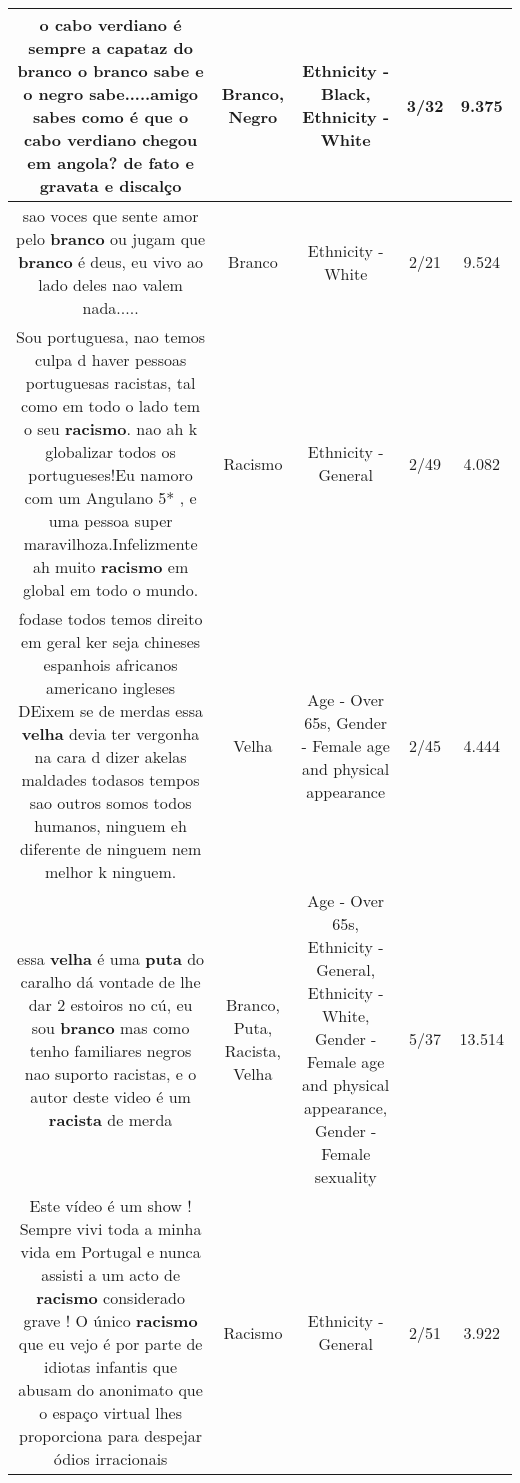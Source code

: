 \documentclass[11pt]{article}
\newlength\mylength
\begin{document}
\begin{center}
\begin{longtable}{|C{.65\mylength}|C{.30\mylength}|C{.12\mylength}|C{.12\mylength}|C{.12\mylength}|}
  \small o cabo verdiano é sempre a capataz do \textbf{branco} o \textbf{branco} sabe e o \textbf{negro} sabe.....amigo sabes como é que o cabo verdiano chegou em angola? de fato e gravata e discalço\normalsize   & Branco, Negro & Ethnicity - Black, Ethnicity - White & 3/32 & 9.375 \\  \hline
  \small sao voces que sente amor pelo \textbf{branco} ou jugam que \textbf{branco} é deus, eu vivo ao lado deles nao valem nada.....\normalsize   & Branco & Ethnicity - White & 2/21 & 9.524 \\  \hline
  \small Sou portuguesa, nao temos culpa d haver pessoas portuguesas racistas, tal como em todo o lado tem o seu \textbf{racismo}. nao ah k globalizar todos os portugueses!Eu namoro com um Angulano 5* , e uma pessoa super maravilhoza.Infelizmente ah muito \textbf{racismo} em global em todo o mundo.\normalsize   & Racismo & Ethnicity - General & 2/49 & 4.082 \\  \hline
  \small fodase todos temos direito em geral ker seja chineses espanhois africanos americano ingleses DEixem se de merdas essa \textbf{v\textbf{elha}} devia ter vergonha na cara d dizer akelas maldades todasos tempos sao outros somos todos humanos, ninguem eh diferente de ninguem nem melhor k ninguem.\normalsize   & Velha & Age - Over 65s, Gender - Female age and physical appearance & 2/45 & 4.444 \\  \hline
  \small essa \textbf{v\textbf{elha}} é uma \textbf{puta} do caralho dá vontade de lhe dar 2 estoiros no cú, eu sou \textbf{branco} mas como tenho familiares negros nao suporto racistas, e o autor deste video é um \textbf{racista} de merda\normalsize   & Branco, Puta, Racista, Velha & Age - Over 65s, Ethnicity - General, Ethnicity - White, Gender - Female age and physical appearance, Gender - Female sexuality & 5/37 & 13.514 \\  \hline
  \small Este vídeo é um show ! Sempre vivi toda a minha vida em Portugal e nunca assisti a um acto de \textbf{racismo} considerado grave ! O único \textbf{racismo} que eu vejo é por parte de idiotas infantis que abusam do anonimato que o espaço virtual lhes proporciona para despejar ódios irracionais\normalsize   & Racismo & Ethnicity - General & 2/51 & 3.922 \\  \hline

\end{longtable}
\end{center}
\end{document}
